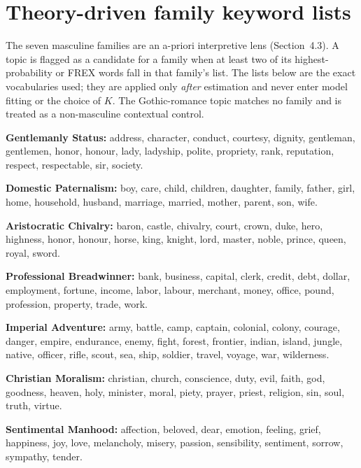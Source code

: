 \documentclass[11pt]{article}
\begin{document}
\appendix
\section{Theory-driven family keyword lists}
\label{app:families}
The seven masculine families are an a-priori interpretive lens (Section~4.3). A
topic is flagged as a candidate for a family when at least two of its
highest-probability or FREX words fall in that family's list. The lists below are
the exact vocabularies used; they are applied only \emph{after} estimation and
never enter model fitting or the choice of $K$. The Gothic-romance topic matches
no family and is treated as a non-masculine contextual control.

\smallskip
\noindent\textbf{Gentlemanly Status:} address, character, conduct, courtesy,
dignity, gentleman, gentlemen, honor, honour, lady, ladyship, polite, propriety,
rank, reputation, respect, respectable, sir, society.

\noindent\textbf{Domestic Paternalism:} boy, care, child, children, daughter,
family, father, girl, home, household, husband, marriage, married, mother, parent,
son, wife.

\noindent\textbf{Aristocratic Chivalry:} baron, castle, chivalry, court, crown,
duke, hero, highness, honor, honour, horse, king, knight, lord, master, noble,
prince, queen, royal, sword.

\noindent\textbf{Professional Breadwinner:} bank, business, capital, clerk,
credit, debt, dollar, employment, fortune, income, labor, labour, merchant, money,
office, pound, profession, property, trade, work.

\noindent\textbf{Imperial Adventure:} army, battle, camp, captain, colonial,
colony, courage, danger, empire, endurance, enemy, fight, forest, frontier,
indian, island, jungle, native, officer, rifle, scout, sea, ship, soldier, travel,
voyage, war, wilderness.

\noindent\textbf{Christian Moralism:} christian, church, conscience, duty, evil,
faith, god, goodness, heaven, holy, minister, moral, piety, prayer, priest,
religion, sin, soul, truth, virtue.

\noindent\textbf{Sentimental Manhood:} affection, beloved, dear, emotion, feeling,
grief, happiness, joy, love, melancholy, misery, passion, sensibility, sentiment,
sorrow, sympathy, tender.



\end{document}
